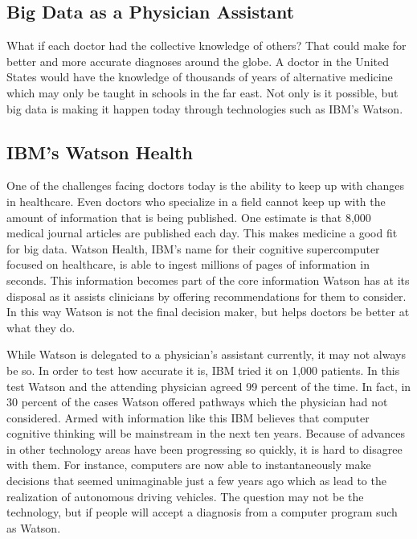 \documentclass[sigconf]{acmart}
\begin{document}
\subsection{Big Data as a Physician Assistant}
What if each doctor had the collective knowledge of others?  That could make 
for better and more accurate diagnoses around the globe.  A doctor in the 
United States would have the knowledge of thousands of years of alternative 
medicine which may only be taught in schools in the far east.  Not only is 
it possible, but big data is making it happen today through technologies such 
as IBM's Watson.

\subsection{IBM's Watson Health}
One of the challenges facing doctors today is the ability to keep up with 
changes in healthcare.  Even doctors who specialize in a field cannot keep 
up with the amount of information that is being published.  One estimate is 
that 8,000 medical journal articles are published each 
day\cite{HealthCareITNews}.  This makes medicine a good fit for big data.  
Watson Health, IBM's name for their cognitive supercomputer focused on 
healthcare, is able to ingest millions of pages of information in seconds.  
This information becomes part of the core information Watson has at its 
disposal as it assists clinicians by offering recommendations for them to 
consider.  In this way Watson is not the final decision maker, but helps 
doctors be better at what they do\cite{PMC4287097}.    

While Watson is delegated to a physician's assistant currently, it may not 
always be so.  In order to test how accurate it is, IBM tried it on 1,000 
patients.  In this test Watson and the attending physician agreed 99 
percent of the time.  In fact, in 30 percent of the cases Watson offered 
pathways which the physician had not considered.  Armed with information 
like this IBM believes that computer cognitive thinking will be mainstream 
in the next ten years\cite{HealthCareITNews}.  Because of advances in other 
technology areas have been progressing so quickly, it is hard to disagree 
with them.  For instance, computers are now able to instantaneously make 
decisions that seemed unimaginable just a few years ago which as lead to 
the realization of autonomous driving vehicles.  The question may not be 
the technology, but if people will accept a diagnosis from a computer 
program such as Watson.
\end{document}
